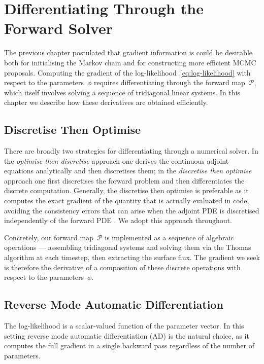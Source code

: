 \chapter{Differentiating Through the Forward Solver}\label{ch:adjoint}

The previous chapter postulated that gradient information is could be desirable
both for initialising the Markov chain and for
constructing more efficient MCMC proposals. Computing the gradient of the
log-likelihood~\cref{eq:log-likelihood} with respect to the
parameters~$\phi$ requires differentiating through the forward
map~$\mathcal{P}$, which itself involves solving a sequence of tridiagonal
linear systems. In this chapter we describe how these derivatives are
obtained efficiently.

\section{Discretise Then Optimise}\label{sec:disc-then-opt}

There are broadly two strategies for differentiating through a numerical
solver. In the \emph{optimise then discretise} approach one derives the
continuous adjoint equations analytically and then discretises them; in the
\emph{discretise then optimise} approach one first discretises the forward
problem and then differentiates the discrete computation. Generally,
the discretise then optimise is preferable as it computes the exact
gradient of the quantity that is actually evaluated in code, avoiding
the consistency errors that can arise
when the adjoint PDE is discretised independently of the forward PDE
\cite{kidger2021neural}. We
adopt this approach throughout.

Concretely, our forward map~$\mathcal{P}$ is implemented as a
sequence of algebraic operations --- assembling tridiagonal systems and
solving them via the Thomas algorithm at each timestep, then extracting
the surface flux. The gradient we seek is therefore the derivative of a
composition of these discrete operations with respect to the
parameters~$\phi$.

\section{Reverse Mode Automatic Differentiation}\label{sec:reverse-ad}

The log-likelihood is a scalar-valued function of the parameter
vector. In this setting  reverse mode
automatic differentiation (AD) is the
natural choice, as it computes the full gradient in a single backward
pass regardless of the number of parameters.

